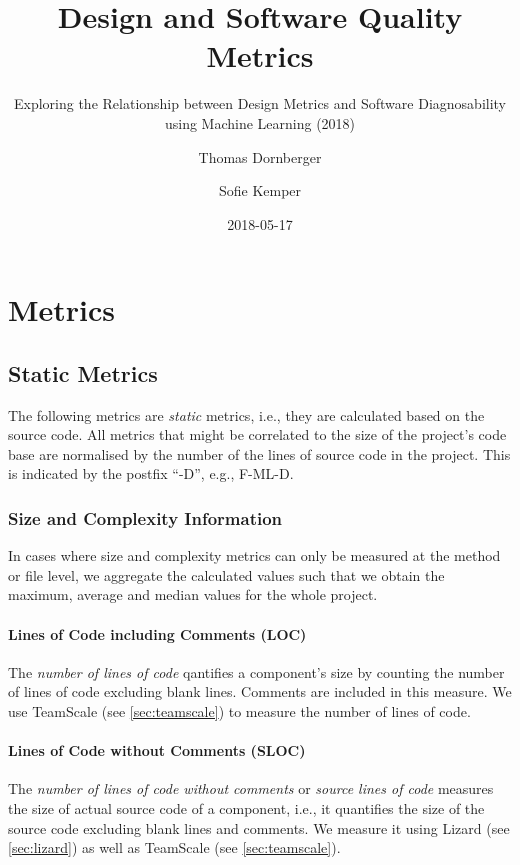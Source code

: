 \documentclass{scrartcl}
\begin{document}
\title{Design and Software Quality Metrics}
\subtitle{Exploring the Relationship between Design Metrics and Software
Diagnosability using Machine Learning (2018)}
\author{Thomas Dornberger \and Sofie Kemper}
\date{2018-05-17}

\maketitle

\section{Metrics}

\subsection{Static Metrics}

The following metrics are \emph{static} metrics, i.e., they are calculated based
on the source code. All metrics that might be correlated to the size of the
project's code base are normalised by the number of the lines of source code in
the project. This is indicated by the postfix \enquote{-D}, e.g., F-ML-D.

\subsubsection{Size and Complexity Information}

In cases where size and complexity metrics can only be measured at the method or
file level, we aggregate the calculated values such that we obtain the maximum,
average and median values for the whole project.

\paragraph{Lines of Code including Comments (LOC)}

The \emph{number of lines of code} qantifies a component's size by counting the
number of lines of code excluding blank lines. Comments are included in this
measure. We use TeamScale (see \ref{sec:teamscale}) to measure the number of
lines of code.

\paragraph{Lines of Code without Comments (SLOC)}

The \emph{number of lines of code without comments} or \emph{source lines of
code} measures the size of actual
source code of a component, i.e., it quantifies the size of the source code
excluding blank lines and comments. We measure it using Lizard (see
\ref{sec:lizard}) as well as TeamScale (see \ref{sec:teamscale}).
\end{document}
